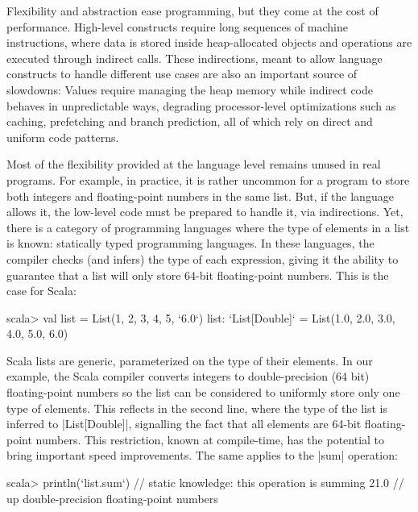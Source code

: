 Flexibility and abstraction ease programming, but they come at the cost of performance. High-level constructs require long sequences of machine instructions, where data is stored inside heap-allocated objects and operations are executed through indirect calls. These indirections, meant to allow language constructs to handle different use cases are also an important source of slowdowns: Values require managing the heap memory while indirect code behaves in unpredictable ways, degrading processor-level optimizations such as caching, prefetching and branch prediction, all of which rely on direct and uniform code patterns. %

Most of the flexibility provided at the language level remains unused in real programs. For example, in practice, it is rather uncommon for a program to store both integers and floating-point numbers in the same list. But, if the language allows it, the low-level code must be prepared to handle it, via indirections. Yet, there is a category of programming languages where the type of elements in a list is known: statically typed programming languages. In these languages, the compiler checks (and infers) the type of each expression, giving it the ability to guarantee that a list will only store 64-bit floating-point numbers. This is the case for Scala:

\begin{lstlisting-nobreak}
 scala> val list = List(1, 2, 3, 4, 5, `6.0`)
 list: `List[Double]` = List(1.0, 2.0, 3.0, 4.0, 5.0, 6.0)
\end{lstlisting-nobreak}

Scala lists are generic, parameterized on the type of their elements. In our example, the Scala compiler converts integers to double-precision (64 bit) floating-point numbers so the list can be considered to uniformly store only one type of elements. This reflects in the second line, where the type of the list is inferred to |List[Double]|, signalling the fact that all elements are 64-bit floating-point numbers. This restriction, known at compile-time, has the potential to bring important speed improvements. The same applies to the |sum| operation:

\begin{lstlisting-nobreak}
 scala> println(`list.sum`) // static knowledge: this operation is summing
 21.0                             // up double-precision floating-point numbers
\end{lstlisting-nobreak}

